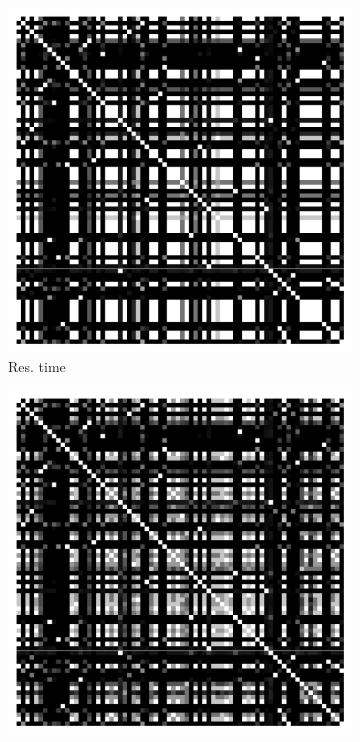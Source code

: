 \begin{figure}[t]
	\centering
        \begin{subfigure}{0.19\textwidth}
                \includegraphics[width=\linewidth]{Figures/hadoop-runtime-commitX.pdf}
                \caption{Res. time}
        \end{subfigure}%
        \begin{subfigure}{0.19\textwidth}
                \includegraphics[width=\linewidth]{Figures/hadoop-cpu-commitX.pdf}

\end{subfigure}
\end{figure}

